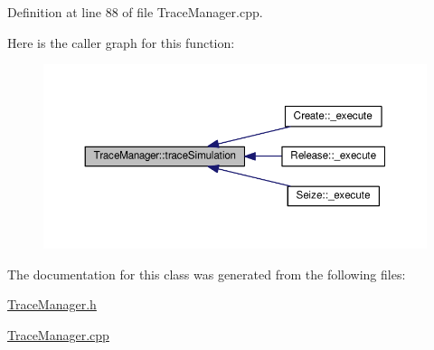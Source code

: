 Definition at line 88 of file Trace\-Manager.\-cpp.



Here is the caller graph for this function\-:
\nopagebreak
\begin{figure}[H]
\begin{center}
\leavevmode
\includegraphics[width=350pt]{class_trace_manager_a5ee0bbb874cc0ad40ff5b1a130a0699f_icgraph}
\end{center}
\end{figure}




The documentation for this class was generated from the following files\-:\begin{DoxyCompactItemize}
\item 
\hyperlink{_trace_manager_8h}{Trace\-Manager.\-h}\item 
\hyperlink{_trace_manager_8cpp}{Trace\-Manager.\-cpp}\end{DoxyCompactItemize}
